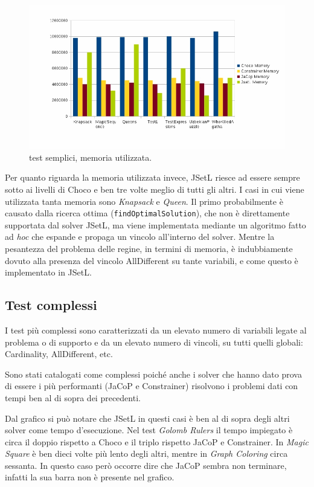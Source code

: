 \begin{figure}[!ht]
\centering
\includegraphics[scale=.45]{img/grafico12.jpg}
\caption{test semplici, memoria utilizzata.}
\end{figure}
Per quanto riguarda la memoria utilizzata invece, JSetL riesce ad essere
sempre sotto ai livelli di Choco e ben tre volte meglio di tutti gli altri.
I casi in cui viene utilizzata tanta memoria sono \emph{Knapsack} e
\emph{Queen}. Il primo probabilmente è causato dalla ricerca ottima
(\texttt{findOptimalSolution}), che non è direttamente supportata dal solver
JSetL, ma viene implementata mediante un algoritmo fatto ad \emph{hoc} che
espande e
propaga un vincolo all'interno del solver. Mentre la pesantezza
del problema delle regine, in termini di
memoria,  è indubbiamente dovuto alla presenza del
vincolo AllDifferent su tante variabili, e come questo è implementato in JSetL.

\subsection{Test complessi}
I test più complessi sono caratterizzati da un elevato numero di variabili
legate al problema o di supporto e da un elevato numero di vincoli, su tutti
quelli globali: Cardinality, AllDifferent, etc.

Sono stati catalogati come complessi poiché anche i solver che hanno dato prova
di essere i più performanti (JaCoP e Constrainer) risolvono i problemi dati
con tempi ben al di sopra dei precedenti.


Dal grafico si può notare che JSetL in questi casi è ben al di sopra degli altri
solver come tempo d'esecuzione. Nel test \emph{Golomb Rulers} il tempo
impiegato è circa il doppio rispetto a Choco e il triplo rispetto JaCoP e
Constrainer. In \emph{Magic Square} è ben dieci volte più lento degli altri,
mentre in \emph{Graph Coloring} circa sessanta. In questo caso però occorre dire
che JaCoP sembra non terminare, infatti la sua barra non è presente nel grafico.


